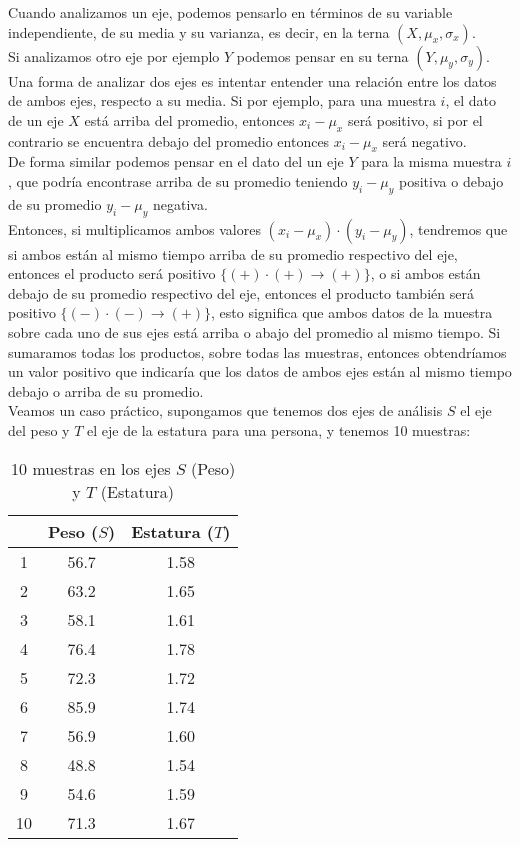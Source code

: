 \documentclass{article}
\begin{document}
Cuando analizamos un eje, podemos pensarlo en términos de su variable independiente, de su media y su varianza, es decir, en la terna $(X, \mu_x, \sigma_x)$.
\\[12pt]
Si analizamos otro eje por ejemplo $Y$ podemos pensar en su terna $(Y, \mu_y, \sigma_y)$.
\\[12pt]
Una forma de analizar dos ejes es intentar entender una relación entre los datos de ambos ejes, respecto a su media. Si por ejemplo, para una muestra $i$, el dato de un eje $X$ está arriba del promedio, entonces $x_i - \mu_x$ será positivo, si por el contrario se encuentra debajo del promedio entonces $x_i - \mu_x$ será negativo.
\\[12pt]
De forma similar podemos pensar en el dato del un eje $Y$ para la misma muestra $i$, que podría encontrase arriba de su promedio teniendo $y_i - \mu_y$ positiva o debajo de su promedio $y_i - \mu_y$ negativa.
\\[12pt]
Entonces, si multiplicamos ambos valores $(x_i - \mu_x) \cdot (y_i - \mu_y)$, tendremos que si ambos están al mismo tiempo arriba de su promedio respectivo del eje, entonces el producto será positivo $\{ (+) \cdot (+) \rightarrow (+) \}$, o si ambos están debajo de su promedio respectivo del eje, entonces el producto también será positivo $\{ (-) \cdot (-) \rightarrow (+) \}$, esto significa que ambos datos de la muestra sobre cada uno de sus ejes está arriba o abajo del promedio al mismo tiempo. Si sumaramos todas los productos, sobre todas las muestras, entonces obtendríamos un valor positivo que indicaría que los datos de ambos ejes están al mismo tiempo debajo o arriba de su promedio.
\\[12pt]
Veamos un caso práctico, supongamos que tenemos dos ejes de análisis $S$ el eje del peso y $T$ el eje de la estatura para una persona, y tenemos 10 muestras:
\begin{table}[h!]
    \centering
    \begin{tabular}{|c|c|c|}
    \hline
    & \textbf{Peso} ($S$) & \textbf{Estatura} ($T$) \\ \hline
    1 & 56.7 & 1.58 \\ \hline
    2 & 63.2 & 1.65 \\ \hline
    3 & 58.1 & 1.61 \\ \hline
    4 & 76.4 & 1.78 \\ \hline
    5 & 72.3 & 1.72 \\ \hline
    6 & 85.9 & 1.74 \\ \hline
    7 & 56.9 & 1.60 \\ \hline
    8 & 48.8 & 1.54 \\ \hline
    9 & 54.6 & 1.59 \\ \hline
    10 & 71.3 & 1.67 \\ \hline
    \end{tabular}
    \caption{10 muestras en los ejes $S$ (Peso) y $T$ (Estatura)}
\end{table}
\end{document}
